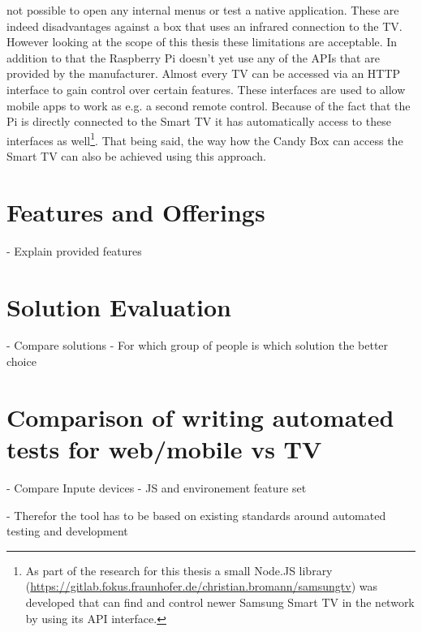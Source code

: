 not possible to open any internal menus or test a native application. These are indeed disadvantages against a box
that uses an infrared connection to the TV. However looking at the scope of this thesis these limitations are acceptable.
In addition to that the Raspberry Pi doesn't yet use any of the APIs that are provided by the manufacturer. Almost every
TV can be accessed via an HTTP interface to gain control over certain features. These interfaces are used to allow
mobile apps to work as e.g. a second remote control. Because of the fact that the Pi is directly connected to the
Smart TV it has automatically access to these interfaces as well\footnote{As part of the research for this thesis
a small Node.JS library (\url{https://gitlab.fokus.fraunhofer.de/christian.bromann/samsungtv}) was developed that can
find and control newer Samsung Smart TV in the network by using its API interface.}. That being said, the way how the
Candy Box can access the Smart TV can also be achieved using this approach.

\section{Features and Offerings\label{sec:features}}

- Explain provided features

\section{Solution Evaluation\label{sec:usab}}

- Compare solutions
- For which group of people is which solution the better choice

\section{Comparison of writing automated tests for web/mobile vs TV\label{sec:diffInWritingTests}}

- Compare Inpute devices
- JS and environement feature set


- Therefor the tool has to be based on existing standards around automated testing and development
